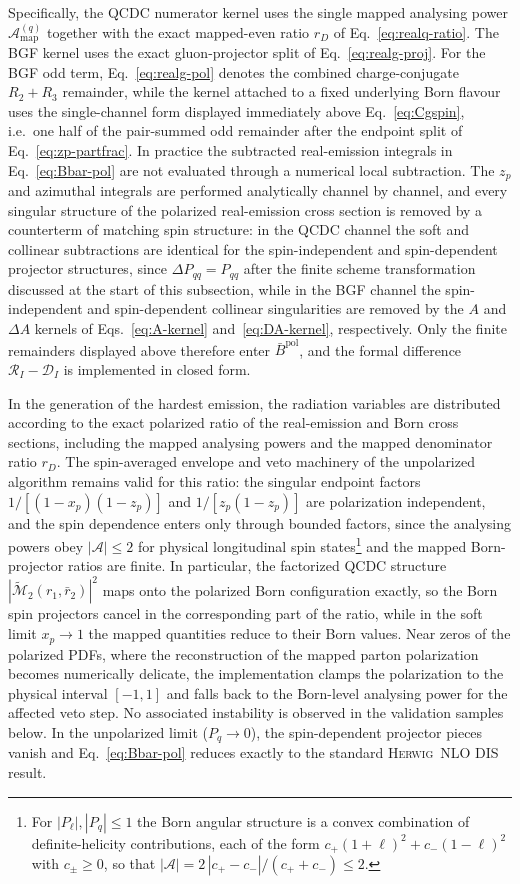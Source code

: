 \documentclass[a4paper,11pt]{article}
\newcommand{\Herwig}{\textsc{Herwig}}
\begin{document}
Specifically, the QCDC numerator kernel uses the single mapped analysing power $\mathcal{A}_{\text{map}}^{(q)}$ together with the exact mapped-even ratio $r_D$ of Eq.~\eqref{eq:realq-ratio}. The BGF kernel uses the exact gluon-projector split of Eq.~\eqref{eq:realg-proj}. For the BGF odd term, Eq.~\eqref{eq:realg-pol} denotes the combined charge-conjugate $R_2+R_3$ remainder, while the kernel attached to a fixed underlying Born flavour uses the single-channel form displayed immediately above Eq.~\eqref{eq:Cgspin}, i.e.\ one half of the pair-summed odd remainder after the endpoint split of Eq.~\eqref{eq:zp-partfrac}.  In practice the subtracted real-emission integrals in Eq.~\eqref{eq:Bbar-pol} are not evaluated through a numerical local subtraction. The $z_p$ and azimuthal integrals are performed analytically channel by channel, and every singular structure of the polarized real-emission cross section is removed by a counterterm of matching spin structure: in the QCDC channel the soft and collinear subtractions are identical for the spin-independent and spin-dependent projector structures, since $\Delta P_{qq}=P_{qq}$ after the finite scheme transformation discussed at the start of this subsection, while in the BGF channel the spin-independent and spin-dependent collinear singularities are removed by the $A$ and $\Delta A$ kernels of Eqs.~\eqref{eq:A-kernel} and~\eqref{eq:DA-kernel}, respectively. Only the finite remainders displayed above therefore enter $\bar B^{\text{pol}}$, and the formal difference $\mathcal{R}_I-\mathcal{D}_I$ is implemented in closed form.

In the generation of the hardest emission, the radiation variables are distributed according to the exact polarized ratio of the real-emission and Born cross sections, including the mapped analysing powers and the mapped denominator ratio $r_D$. The spin-averaged envelope and veto machinery of the unpolarized algorithm remains valid for this ratio: the singular endpoint factors $1/[(1-x_p)(1-z_p)]$ and $1/[z_p(1-z_p)]$ are polarization independent, and the spin dependence enters only through bounded factors, since the analysing powers obey $|\mathcal{A}|\le 2$ for physical longitudinal spin states\footnote{For $|P_\ell|,|P_q|\le1$ the Born angular structure is a convex combination of definite-helicity contributions, each of the form $c_+(1+\ell)^2+c_-(1-\ell)^2$ with $c_\pm\ge0$, so that $|\mathcal{A}|=2\,|c_+-c_-|/(c_++c_-)\le2$.} and the mapped Born-projector ratios are finite. In particular, the factorized QCDC structure $|\widetilde{\mathcal{M}}_2(r_1,\bar r_2)|^2$ maps onto the polarized Born configuration exactly, so the Born spin projectors cancel in the corresponding part of the ratio, while in the soft limit $x_p\to1$ the mapped quantities reduce to their Born values. Near zeros of the polarized PDFs, where the reconstruction of the mapped parton polarization becomes numerically delicate, the implementation clamps the polarization to the physical interval $[-1,1]$ and falls back to the Born-level analysing power for the affected veto step. No associated instability is observed in the validation samples below.
In the unpolarized limit ($P_q\to0$), the spin-dependent projector pieces vanish and Eq.~\eqref{eq:Bbar-pol} reduces exactly to the standard \Herwig\ NLO DIS result.
\end{document}
